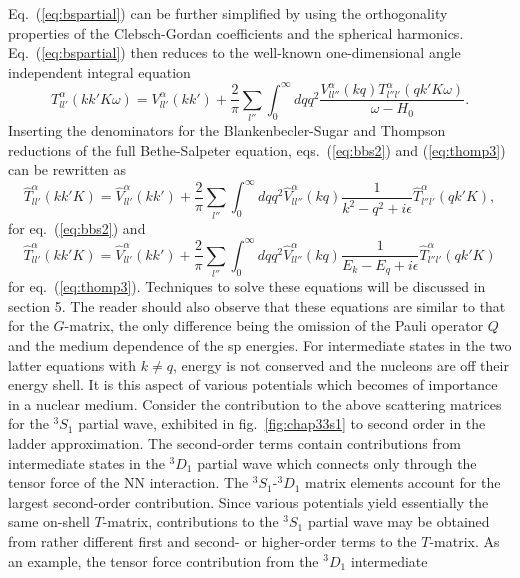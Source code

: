 Eq.\ (\ref{eq:bspartial}) can be further simplified
by using the orthogonality
properties of the Clebsch-Gordan coefficients and the spherical harmonics.
Eq.\ (\ref{eq:bspartial}) then reduces to the well-known
one-dimensional angle independent
integral equation
\begin{equation}
   T_{ll'}^{\alpha}(kk'K\omega)=V_{ll'}^{\alpha}(kk')
   +\frac{2}{\pi}\sum_{l''}\int_{0}^{\infty} dqq^2
   \frac{V_{ll''}^{\alpha}(kq)
   T_{l''l'}^{\alpha}(qk'K\omega)}
   {\omega -H_0}.
\end{equation}
Inserting the denominators for the Blankenbecler-Sugar and Thompson
reductions of the full Bethe-Salpeter equation, eqs.\
(\ref{eq:bbs2}) and (\ref{eq:thomp3}) can be rewritten as
\begin{equation}
   \hat{T}_{ll'}^{\alpha}(kk'K)=\hat{V}_{ll'}^{\alpha}(kk')
   +\frac{2}{\pi}\sum_{l''}\int_{0}^{\infty} dqq^2
   \hat{V}_{ll''}^{\alpha}(kq)
   \frac{1}{k^2-q^2 +i\epsilon}
   \hat{T}_{l''l'}^{\alpha}(qk'K),
\end{equation}
for eq.\ (\ref{eq:bbs2}) and
\begin{equation}
   \hat{T}_{ll'}^{\alpha}(kk'K)=\hat{V}_{ll'}^{\alpha}(kk')
   +\frac{2}{\pi}\sum_{l''}\int_{0}^{\infty} dqq^2
   \hat{V}_{ll''}^{\alpha}(kq)
    \frac{1}
     {E_k-E_q +i\epsilon}\hat{T}_{l''l'}^{\alpha}(qk'K)
\end{equation}
for eq.\ (\ref{eq:thomp3}).
Techniques to solve these equations will be discussed in
section 5. The reader should also observe that these equations are similar
to that for the $G$-matrix, the only difference being the omission of the
Pauli operator $Q$ and the medium dependence of the sp energies.
For intermediate states in the two latter equations with $k\neq q$, energy
is not conserved and the nucleons are off their energy shell. It is this
aspect of various potentials which becomes of importance in a nuclear medium.
Consider the contribution to the above scattering matrices for the $^3S_1$
partial wave, exhibited in
fig.\ \ref{fig:chap33s1} to second order
in the ladder approximation. The second-order terms contain
contributions from intermediate states in the $^3D_1$ partial wave
which connects only through the tensor force of the NN interaction. The
$^3S_1$-$^3D_1$ matrix elements account for the largest
second-order contribution.
Since various potentials yield essentially the same on-shell $T$-matrix,
contributions to the $^3S_1$ partial wave may be obtained from
rather different first and second- or higher-order terms to the $T$-matrix.
As an example, the tensor force contribution from the $^3D_1$ intermediate
